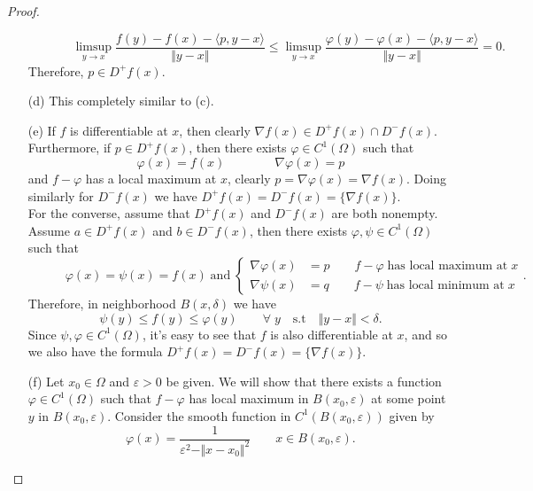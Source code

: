 \documentclass[12pt, oneside]{amsart}  	%
\begin{document}
\begin{proof}
\begin{itemize}
\begin{equation*}
\quad\;\;\qquad \limsup_{y\longrightarrow x} \frac{f(y) - f(x) - \langle p,y-x\rangle}{\Vert y-x\Vert} \leq \limsup_{y\longrightarrow x} \frac{\varphi(y) - \varphi(x) - \langle p,y-x\rangle}{\Vert y-x\Vert} = 0.
\end{equation*}
Therefore, $p\in D^+f(x)$.
\item[(d)] This completely similar to (c).
\item[(e)] If $f$ is differentiable at $x$, then clearly $\nabla f(x) \in D^+f(x)\cap D^-f(x)$. Furthermore, if $p\in D^+f(x)$, then there exists $\varphi\in C^1(\Omega)$ such that
\begin{equation*}
\varphi(x) = f(x) \qquad\qquad \nabla \varphi(x) = p
\end{equation*}
and $f-\varphi$ has a local maximum at $x$, clearly $p = \nabla \varphi(x) = \nabla f(x)$. Doing similarly for $D^-f(x)$ we have $D^+f(x) = D^-f(x) = \{\nabla f(x) \}$.\\
For the converse, assume that $D^+f(x)$ and $D^-f(x)$ are both nonempty. Assume $a\in D^+f(x)$ and $b\in D^-f(x)$, then there exists $\varphi,\psi\in C^1(\Omega)$ such that
\begin{equation*}
\qquad\quad \varphi(x) = \psi(x) = f(x) \;\text{and}\; \begin{cases}
\nabla \varphi(x) &= p\qquad f- \varphi\;\text{has local maximum at}\;x\\
\nabla \psi(x) &= q \qquad f- \psi\;\text{has local minimum at}\;x
\end{cases}.
\end{equation*}
Therefore, in neighborhood $B(x,\delta)$ we have
\begin{equation*}
\psi(y) \leq f(y) \leq \varphi(y) \qquad\forall\;y\quad\text{s.t}\quad \Vert y-x\Vert < \delta.
\end{equation*}
Since $\psi, \varphi\in C^1(\Omega)$, it's easy to see that $f$ is also differentiable at $x$, and so we also have the formula $D^+f(x) = D^-f(x) = \{\nabla f(x) \}$.
\item[(f)] Let $x_0\in \Omega$ and $\varepsilon>0$ be given. We will show that there exists a function $\varphi\in C^1(\Omega)$ such that $f-\varphi$ has local maximum in $B(x_0,\varepsilon)$ at some point $y$ in $B(x_0,\varepsilon)$. Consider the smooth function in $C^1(B(x_0,\varepsilon))$ given by
\begin{equation*}
\varphi(x) = \frac{1}{\varepsilon^2 - \Vert x-x_0\Vert^2} \qquad x\in B(x_0,\varepsilon).
\end{equation*}

\end{itemize}
\end{proof}
\end{document}
